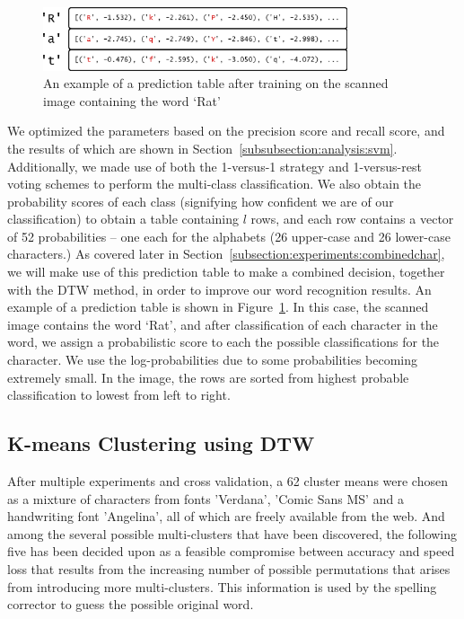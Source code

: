 \documentclass[12pt]{article}
\begin{document}
		\begin{figure}[htbp!]
		\centering
		\includegraphics[width=0.8\textwidth]{svm_table.eps}
		\caption{An example of a prediction table after training on the scanned image containing the word `Rat'}
		\label{figure:svm_table}
		\end{figure}

		We optimized the parameters based on the precision score and recall score, and the results of which are shown in Section~\ref{subsubsection:analysis:svm}. Additionally, we made use of both the 1-versus-1 strategy and 1-versus-rest voting schemes to perform the multi-class classification. We also obtain the probability scores of each class (signifying how confident we are of our classification) to obtain a table containing $l$ rows, and each row contains a vector of 52 probabilities -- one each for the alphabets (26 upper-case and 26 lower-case characters.) As covered later in Section~\ref{subsection:experiments:combinedchar}, we will make use of this prediction table to make a combined decision, together with the DTW method, in order to improve our word recognition results. An example of a prediction table is shown in Figure~\ref{figure:svm_table}. In this case, the scanned image contains the word `Rat', and after classification of each character in the word, we assign a probabilistic score to each the possible classifications for the character. We use the log-probabilities due to some probabilities becoming extremely small. In the image, the rows are sorted from highest probable classification to lowest from left to right.

	
	\subsection{K-means Clustering using DTW}
	\label{subsection:experiments:dtw}
	
	After multiple experiments and cross validation, a 62 cluster means were chosen as a mixture of characters from fonts 'Verdana', 'Comic Sans MS' and a handwriting font 'Angelina', all of which are freely available from the web. And among the several possible multi-clusters that have been discovered, the following five has been decided upon as a feasible compromise between accuracy and speed loss that results from the increasing number of possible permutations that arises from introducing more multi-clusters. This information is used by the spelling corrector to guess the possible original word.
	
\end{document}
